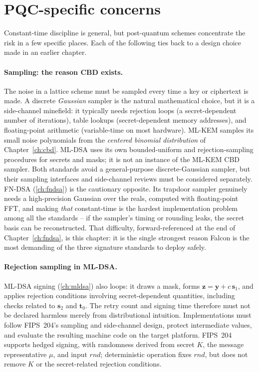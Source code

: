 \section{PQC-specific concerns}

Constant-time discipline is general, but post-quantum schemes concentrate the risk in
a few specific places. Each of the following ties back to a design choice made in an
earlier chapter.

\paragraph{Sampling: the reason CBD exists.}
The noise in a lattice scheme must be sampled every time a key or ciphertext is made.
A discrete \emph{Gaussian} sampler is the natural mathematical choice, but it is a
side-channel minefield: it typically needs rejection loops (a secret-dependent number
of iterations), table lookups (secret-dependent memory addresses), and floating-point
arithmetic (variable-time on most hardware). ML-KEM samples its small noise
polynomials from the \emph{centered binomial distribution} of
Chapter~\ref{ch:cbd}. ML-DSA uses its own bounded-uniform and rejection-sampling
procedures for secrets and masks; it is not an instance of the ML-KEM CBD sampler.
Both standards avoid a general-purpose discrete-Gaussian sampler, but their sampling
interfaces and side-channel reviews must be considered separately. FN-DSA
(\ref{ch:fndsa}) is the cautionary opposite. Its trapdoor sampler genuinely needs a high-precision Gaussian
over the reals, computed with floating-point FFT, and making \emph{that} constant-time
is the hardest implementation problem among all the standards -- if the sampler's
timing or rounding leaks, the secret basis can be reconstructed. That difficulty,
forward-referenced at the end of Chapter~\ref{ch:fndsa}, is this chapter: it is the
single strongest reason Falcon is the most demanding of the three signature standards
to deploy safely.

\paragraph{Rejection sampling in ML-DSA.}
ML-DSA signing (\ref{ch:mldsa}) also loops: it draws a mask, forms
$\mathbf{z}=\mathbf{y}+c\,\mathbf{s}_1$, and applies rejection conditions involving
secret-dependent quantities, including checks related to $\mathbf{s}_2$ and
$\mathbf{t}_0$. The retry count and signing time therefore must not be declared
harmless merely from distributional intuition. Implementations must follow FIPS~204's
sampling and side-channel design, protect intermediate values, and evaluate the
resulting machine code on the target platform. FIPS~204 supports hedged signing, with
randomness derived from secret $K$, the message representative $\mu$, and input $rnd$;
deterministic operation fixes $rnd$, but does not remove $K$ or the secret-related
rejection conditions.

